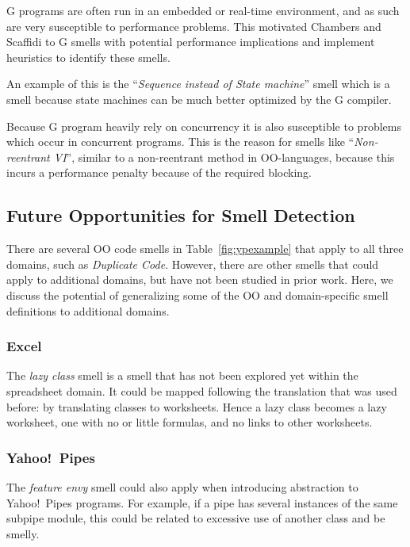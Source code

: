 \documentclass[10pt,conference,compsocconf]{IEEEtran}
\newcommand{\todo}[1]{\textbf{TODO: #1}}
\begin{document}
G programs are often run in an embedded or real-time environment, and as such are very susceptible to performance problems. This motivated Chambers and Scaffidi \cite{chambers2013smell} to G smells with potential performance implications and implement heuristics to identify these smells.

An example of this is the ``\textit{Sequence instead of State machine}'' smell which is a smell because state machines can be much better optimized by the G compiler.

Because G program heavily rely on concurrency it is also susceptible to problems which occur in concurrent programs.
This is the reason for smells like ``\textit{Non-reentrant VI}'', similar to a non-reentrant method in OO-languages, because this incurs a performance penalty because of the required blocking.

\subsection{Future Opportunities for Smell Detection}
\label{subsec:futuresmells}
There are several OO code smells in Table~\ref{fig:ypexample} that apply to all three domains, such as \emph{Duplicate Code}. However, there are other smells that could apply to additional domains, but have not been studied in prior work. Here, we discuss the potential of generalizing some of the OO and domain-specific smell definitions to additional domains. 

\subsubsection{Excel}
The \emph{lazy class} smell is a smell that has not been explored yet within the spreadsheet domain. It could be mapped following the translation that was used before: by translating classes to worksheets. Hence a lazy class becomes a lazy worksheet, one with no or little formulas, and no links to other worksheets.


\subsubsection{Yahoo!\ Pipes}
\label{sec:smells:future:yp}
The \emph{feature envy} smell could also apply when introducing abstraction to Yahoo!\ Pipes programs. For example, if a pipe has several instances of the same subpipe module, this could be related to excessive use of another class and be smelly. 
\end{document}
